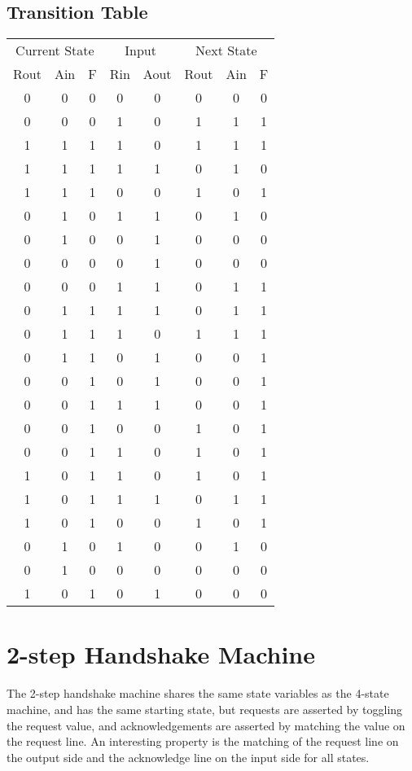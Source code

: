 \documentclass[10pt]{article}
\begin{document}
\subsection{Transition Table}
\begin{tabular}{ c c c | c c | c c c }
\multicolumn{3}{c|}{Current State} & \multicolumn{2}{c|}{Input} & \multicolumn{3}{c}{Next State} \\
Rout & Ain & F & Rin & Aout & Rout & Ain & F \\ \hline
0 & 0 & 0 & 0 & 0 & 0 & 0 & 0 \\ 
0 & 0 & 0 & 1 & 0 & 1 & 1 & 1 \\ 
1 & 1 & 1 & 1 & 0 & 1 & 1 & 1 \\ 
1 & 1 & 1 & 1 & 1 & 0 & 1 & 0 \\ 
1 & 1 & 1 & 0 & 0 & 1 & 0 & 1 \\ 
0 & 1 & 0 & 1 & 1 & 0 & 1 & 0 \\ 
0 & 1 & 0 & 0 & 1 & 0 & 0 & 0 \\ 
0 & 0 & 0 & 0 & 1 & 0 & 0 & 0 \\ 
0 & 0 & 0 & 1 & 1 & 0 & 1 & 1 \\ 
0 & 1 & 1 & 1 & 1 & 0 & 1 & 1 \\ 
0 & 1 & 1 & 1 & 0 & 1 & 1 & 1 \\ 
0 & 1 & 1 & 0 & 1 & 0 & 0 & 1 \\ 
0 & 0 & 1 & 0 & 1 & 0 & 0 & 1 \\ 
0 & 0 & 1 & 1 & 1 & 0 & 0 & 1 \\ 
0 & 0 & 1 & 0 & 0 & 1 & 0 & 1 \\ 
0 & 0 & 1 & 1 & 0 & 1 & 0 & 1 \\ 
1 & 0 & 1 & 1 & 0 & 1 & 0 & 1 \\ 
1 & 0 & 1 & 1 & 1 & 0 & 1 & 1 \\ 
1 & 0 & 1 & 0 & 0 & 1 & 0 & 1 \\ 
0 & 1 & 0 & 1 & 0 & 0 & 1 & 0 \\ 
0 & 1 & 0 & 0 & 0 & 0 & 0 & 0 \\ 
1 & 0 & 1 & 0 & 1 & 0 & 0 & 0 \\ 
\end{tabular}
\pagebreak{}

\section{2-step Handshake Machine}

The 2-step handshake machine shares the same state variables as the 4-state machine, and has the same starting state, but requests are asserted by toggling the request value, and acknowledgements are asserted by matching the value on the request line. An interesting property is the matching of the request line on the output side and the acknowledge line on the input side for all states. 
\end{document}

